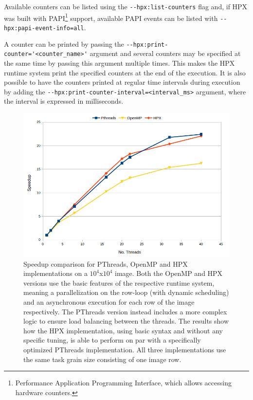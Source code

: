 Available counters can be listed using the \verb/--hpx:list-counters/ flag and, if HPX was built with PAPI\footnote{Performance Application Programming Interface, which allows accessing hardware counters.} support, available PAPI events can be listed with \verb/--hpx:papi-event-info=all/.

A counter can be printed by passing the \verb/--hpx:print-counter='<counter_name>'/ argument and several counters may be specified at the same time by passing this argument multiple times.
This makes the HPX runtime system print the specified counters at the end of the execution. It is also possible to have the counters printed at regular time intervals during execution by adding the \verb/--hpx:print-counter-interval=<interval_ms>/ argument, where the interval is expressed in milliseconds.
\begin{figure}[t]
 	\begin{center}
 		\includegraphics[scale=0.40]{Figures/mandelbrot_speedup_comparison.png}
 		\caption{Speedup comparison for PThreads, OpenMP and HPX implementations
 		on a $10^4$x$10^4$ image. Both the OpenMP and HPX versions use the basic features of the respective runtime system, meaning a parallelization on the row-loop (with dynamic scheduling) and an asynchronous execution for each row of the image respectively. The PThreads version instead includes a more complex logic to ensure load balancing between the threads. The results show how the HPX implementation, using basic syntax and without any specific tuning, is able to perform on par with a specifically optimized PThreads implementation. All three implementations use the same task grain size consisting of one image row.}
 		\label{fig:speedupComparison}
 	\end{center}
\end{figure}

